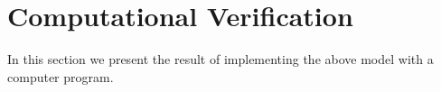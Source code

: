 \documentclass{birkjour}
\theoremstyle{definition}
\theoremstyle{remark}
\numberwithin{equation}{section}
\begin{document}
\section{Computational Verification}

In this section we present the result of implementing the above
model with a computer program.



\end{document}
